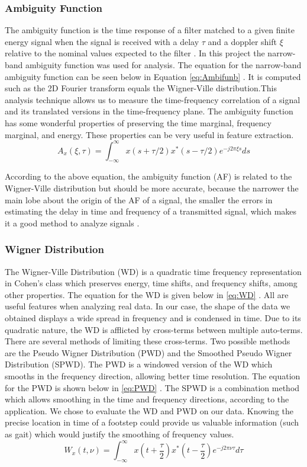 \documentclass{article}[11pt]
\newcommand{\bp}[1] {\left( #1 \right)}
\newcommand{\infint}{\int_{-\infty}^\infty}
\begin{document}
\subsubsection{Ambiguity Function}
\label{sec:ambig}
The ambiguity function is the time response of a filter matched to a given finite energy signal when the signal is received with a delay $\tau$ and a doppler shift $\xi$ relative to the nominal values expected to the filter \cite{Jeong1992}.  In this project the narrow-band ambiguity function was used for analysis. The equation  for the narrow-band ambiguity function can be seen below in Equation \eqref{eq:Ambifunb} \cite{Auger2005}. It is computed such as the 2D Fourier transform equals the Wigner-Ville distribution.This analysis technique allows us to measure the time-frequency correlation of a signal and its translated versions in the time-frequency plane. The ambiguity function has some wonderful properties of preserving the time marginal, frequency marginal, and energy. These properties can be very useful in feature extraction.
\begin{equation}
\label{eq:Ambifunb}
A_x(\xi, \tau) = \infint x(s +\tau/2)x^*(s - \tau/2) e^{-j2\pi \xi s} ds
\end{equation}

            According to the above equation, the ambiguity function (AF) is related to the Wigner-Ville distribution but should be more accurate, because the narrower the main lobe about the origin of the AF of a signal, the smaller the errors in estimating the delay in time and frequency of a transmitted signal, which makes it a good method to analyze signals \cite{Altes1980}.
\subsubsection{Wigner Distribution}
\label{sec:WD}
The Wigner-Ville Distribution (WD) is a quadratic time frequency representation in Cohen's class which preserves energy, time shifts, and frequency shifts, among other properties.  The equation for the WD is given below in  \eqref{eq:WD} \cite{Auger2005}. All are useful features when analyzing real data.  In our case, the shape of the data we obtained displays a wide spread in frequency and is condensed in time.  Due to its quadratic nature, the WD is afflicted by cross-terms between multiple auto-terms.  There are several methods of limiting these cross-terms.  Two possible methods are the Pseudo Wigner Distribution (PWD) and the Smoothed Pseudo Wigner Distribution (SPWD). The PWD is a windowed version of the WD which smooths in the frequency direction, allowing better time resolution. The equation for the PWD is shown below in \eqref{eq:PWD} \cite{Auger2005}. The SPWD is a combination method which allows smoothing in the time and frequency directions, according to the application.  We chose to evaluate the WD and PWD on our data. Knowing the precise location in time of a footstep could provide us valuable information (such as gait) which would justify the smoothing of frequency values.
\begin{equation}
\label{eq:WD}
W_x(t, \nu) = \infint x\bp{t+\frac{\tau}{2}} x^*\bp{t-\frac{\tau}{2}}e^{-j2\pi \nu \tau} d\tau
\end{equation}
\end{document}
